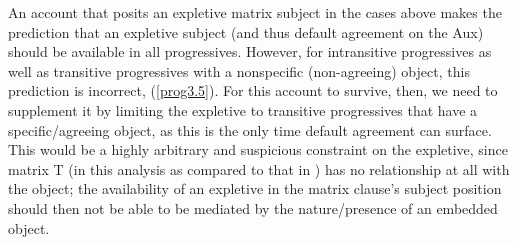 \documentclass[output=paper
,modfonts
,nonflat]{langsci/langscibook}
\begin{document}
An account that posits an expletive matrix subject in the cases above makes the prediction that an expletive subject (and thus default agreement on the Aux) should be available in all progressives. However, for intransitive progressives as well as transitive progressives with a nonspecific (non-agreeing) object, this prediction is incorrect, (\ref{prog3.5}). For this account to survive, then, we need to supplement it by limiting the expletive to transitive progressives that have a specific/agreeing object, as this is the only time default agreement can surface. This would be a highly arbitrary and suspicious constraint on the expletive, since matrix T (in this analysis as compared to that in ) has no relationship at all with the object; the availability of an expletive in the matrix clause's subject position should then not be able to be mediated by the nature/presence of an embedded object.
\end{document}
